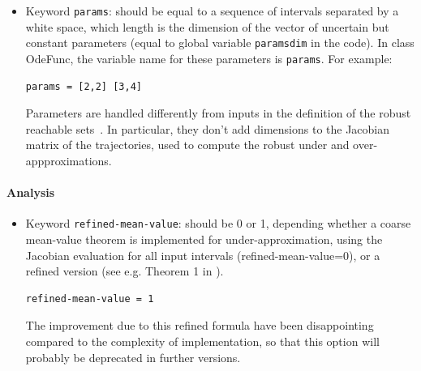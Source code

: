 \documentclass{article}
\begin{document}
\begin{itemize}
\item Keyword \texttt{params}: should be equal to  a sequence of  intervals separated by a white space,  which length is the dimension of the vector of uncertain but constant parameters (equal to global variable  \texttt{paramsdim} in the code).  In class OdeFunc, the variable name for these parameters is \texttt{params}.
For example:
\begin{verbatim}
params = [2,2] [3,4]
\end{verbatim}
Parameters are handled differently from inputs in the definition of the robust reachable sets~\cite{hscc19}.  In particular,  they don't add dimensions to the Jacobian matrix of the trajectories, used to compute the robust under and over-appproximations. 
\end{itemize}

\paragraph{Analysis}
\begin{itemize}
\item Keyword \texttt{refined-mean-value}: should be 0 or 1,  depending whether a coarse mean-value theorem is implemented for under-approximation, using the Jacobian evaluation for all input intervals (refined-mean-value=0), or a refined version (see e.g. Theorem 1 in \cite{lcss2020}).
\begin{verbatim}
refined-mean-value = 1
\end{verbatim}
The improvement due to this refined formula have been disappointing compared to the complexity of implementation, so that this option will probably be deprecated in further versions. 
\end{itemize}
\end{document}
